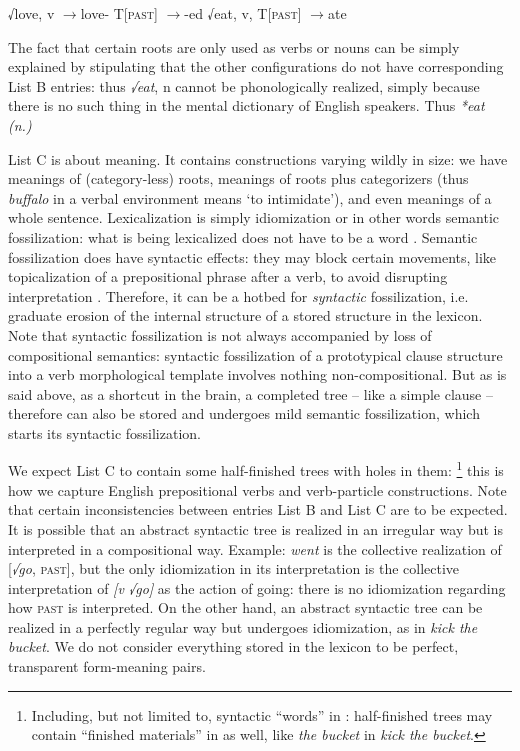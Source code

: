 \documentclass[a4paper, oneside, scheme=plain, 12pt]{article}
\newcommand*{\textto}{$\to$}
\newcommand{\form}[1]{\emph{#1}}
\newcommand{\translate}[1]{`#1'}
\newcommand*{\category}[1]{\textsc{#1}}
\begin{document}
\begin{exe}
    \ex\label{ex:vi} \begin{xlist}
        \ex √love, v \textto love-
        \ex T[\category{past}] \textto -ed
        \ex √eat, v, T[\category{past}] \textto ate
    \end{xlist}
\end{exe}

The fact that certain roots are only used as verbs or nouns
can be simply explained by stipulating that the other configurations do not have corresponding List B entries:
thus \form{√eat}, n cannot be phonologically realized,
simply because there is no such thing in the mental dictionary of English speakers.
Thus \form{*eat (n.)}

List C is about meaning. It contains constructions varying wildly in size:
we have meanings of (category-less) roots,
meanings of roots plus categorizers (thus \form{buffalo} in a verbal environment means \translate{to intimidate}),
and even meanings of a whole sentence.
Lexicalization is simply idiomization or in other words semantic fossilization:
what is being lexicalized does not have to be a word \citep{harley1999distributed}.
Semantic fossilization does have syntactic effects:
they may block certain movements, like topicalization of a prepositional phrase 
after a verb, to avoid disrupting interpretation \citep{nediger2017unifying}.
Therefore, it can be a hotbed for \emph{syntactic} fossilization,
i.e. graduate erosion of the internal structure of a stored structure in the lexicon.
Note that syntactic fossilization is not always accompanied by loss of compositional semantics:
syntactic fossilization of a prototypical clause structure 
into a verb morphological template involves nothing non-compositional.
But as is said above, as a shortcut in the brain,
a completed tree -- like a simple clause -- therefore can also be stored
and undergoes mild semantic fossilization,
which starts its syntactic fossilization.

We expect List C to contain some half-finished trees with holes in them:%
\footnote{
    Including, but not limited to, syntactic ``words'' in :
    half-finished trees may contain ``finished materials'' in  as well,
    like \form{the bucket} in \form{kick the bucket}.
}
this is how we capture English prepositional verbs and verb-particle constructions.
Note that certain inconsistencies between entries List B and List C are to be expected.
It is possible that an abstract syntactic tree is realized in an irregular way but is interpreted in a compositional way.
Example: \form{went} is the collective realization of [\form{√go}, \category{past}],
but the only idiomization in its interpretation is the collective interpretation of \form{[v √go]}
as the action of going:
there is no idiomization regarding how \category{past} is interpreted.
On the other hand, an abstract syntactic tree can be realized in a perfectly regular way
but undergoes idiomization, as in \form{kick the bucket}.
We do not consider everything stored in the lexicon to be perfect, transparent form-meaning pairs.
\end{document}
